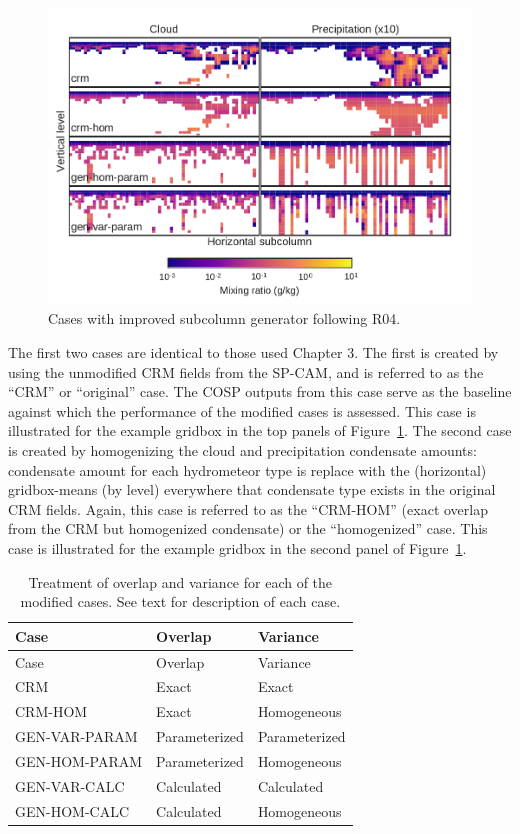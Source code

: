 \begin{figure}[htbp]
\centering
\includegraphics{graphics/subgrid2_mxratio_example.pdf}
\caption{\label{fig:mxratioExample2}Cases with improved subcolumn
generator following R04.}\label{fig:mxratioExample2}
\end{figure}

The first two cases are identical to those used Chapter 3. The first is
created by using the unmodified CRM fields from the SP-CAM, and is
referred to as the ``CRM'' or ``original'' case. The COSP outputs from
this case serve as the baseline against which the performance of the
modified cases is assessed. This case is illustrated for the example
gridbox in the top panels of Figure~\ref{fig:mxratioExample2}. The
second case is created by homogenizing the cloud and precipitation
condensate amounts: condensate amount for each hydrometeor type is
replace with the (horizontal) gridbox-means (by level) everywhere that
condensate type exists in the original CRM fields. Again, this case is
referred to as the ``CRM-HOM'' (exact overlap from the CRM but
homogenized condensate) or the ``homogenized'' case. This case is
illustrated for the example gridbox in the second panel of
Figure~\ref{fig:mxratioExample2}.

\begin{longtable}[]{@{}lll@{}}
\caption{\label{tbl:subgridCases}Treatment of overlap and variance for
each of the modified cases. See text for description of each case.
}\tabularnewline
\toprule
Case & Overlap & Variance\tabularnewline
\midrule
\endfirsthead
\toprule
Case & Overlap & Variance\tabularnewline
\midrule
\endhead
CRM & Exact & Exact\tabularnewline
CRM-HOM & Exact & Homogeneous\tabularnewline
GEN-VAR-PARAM & Parameterized & Parameterized\tabularnewline
GEN-HOM-PARAM & Parameterized & Homogeneous\tabularnewline
GEN-VAR-CALC & Calculated & Calculated\tabularnewline
GEN-HOM-CALC & Calculated & Homogeneous\tabularnewline
\bottomrule
\end{longtable}

